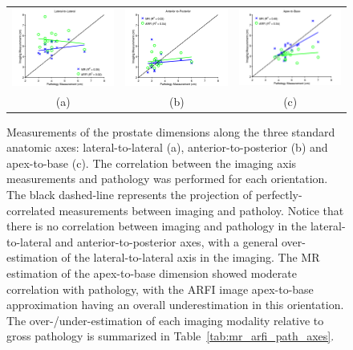 \begin{figure}[htb!]
\centering
\begin{tabular}{ccc}
\includegraphics[width=0.3\linewidth]{figs/Lateral-to-Lateral} &
\includegraphics[width=0.3\linewidth]{figs/Anterior-to-Posterior} &
\includegraphics[width=0.3\linewidth]{figs/Apex-to-Base} \\
(a) & (b) & (c) \\
\end{tabular}
\caption{Measurements of the prostate dimensions along the three standard
anatomic axes: lateral-to-lateral (a), anterior-to-posterior (b) and
apex-to-base (c).  The correlation between the imaging axis measurements and
pathology was performed for each orientation.  The black dashed-line represents
the projection of perfectly-correlated measurements between imaging and
patholoy.  Notice that there is no correlation between imaging and pathology in
the lateral-to-lateral and anterior-to-posterior axes, with a general
over-estimation of the lateral-to-lateral axis in the imaging.  The MR
estimation of the apex-to-base dimension showed moderate correlation with
pathology, with the ARFI image apex-to-base approximation having an overall
underestimation in this orientation.  The over-/under-estimation of each imaging modality relative to gross pathology is summarized in Table~\ref{tab:mr_arfi_path_axes}.}
\label{fig:mr_arfi_path_axes} 
\end{figure}
